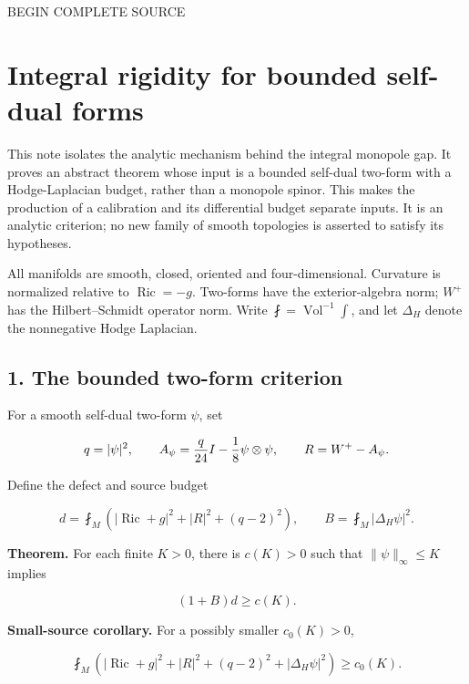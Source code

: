 \documentclass[
  10pt,
]{article}
\begin{document}
BEGIN COMPLETE SOURCE

\hypertarget{integral-rigidity-for-bounded-self-dual-forms}{%
\section{Integral rigidity for bounded self-dual
forms}\label{integral-rigidity-for-bounded-self-dual-forms}}

This note isolates the analytic mechanism behind the integral monopole
gap. It proves an abstract theorem whose input is a bounded self-dual
two-form with a Hodge-Laplacian budget, rather than a monopole spinor.
This makes the production of a calibration and its differential budget
separate inputs. It is an analytic criterion; no new family of smooth
topologies is asserted to satisfy its hypotheses.

All manifolds are smooth, closed, oriented and four-dimensional.
Curvature is normalized relative to \(\operatorname{Ric}=-g\). Two-forms
have the exterior-algebra norm; \(W^+\) has the Hilbert--Schmidt
operator norm. Write \(\fint=\operatorname{Vol}^{-1}\int\), and let
\(\Delta_H\) denote the nonnegative Hodge Laplacian.

\hypertarget{the-bounded-two-form-criterion}{%
\subsection{1. The bounded two-form
criterion}\label{the-bounded-two-form-criterion}}

For a smooth self-dual two-form \(\psi\), set

\[
 q=|\psi|^2,\qquad
 A_\psi={q\over24}I-{1\over8}\psi\otimes\psi,
 \qquad R=W^+-A_\psi.
\]

Define the defect and source budget

\[
 d=\fint_M\left(|\operatorname{Ric}+g|^2+|R|^2+(q-2)^2\right),
 \qquad B=\fint_M|\Delta_H\psi|^2.
\]

\textbf{Theorem.} For each finite \(K>0\), there is \(c(K)>0\) such that
\(\|\psi\|_\infty\le K\) implies

\[
                    \boxed{(1+B)d\ge c(K).}              \tag{1}
\]

\textbf{Small-source corollary.} For a possibly smaller \(c_0(K)>0\),

\[
 \boxed{\quad
 \fint_M\left(
 |\operatorname{Ric}+g|^2+|R|^2+(q-2)^2+|\Delta_H\psi|^2
 \right)\ge c_0(K).
 \quad}                                                     \tag{1a}
\]
\end{document}
